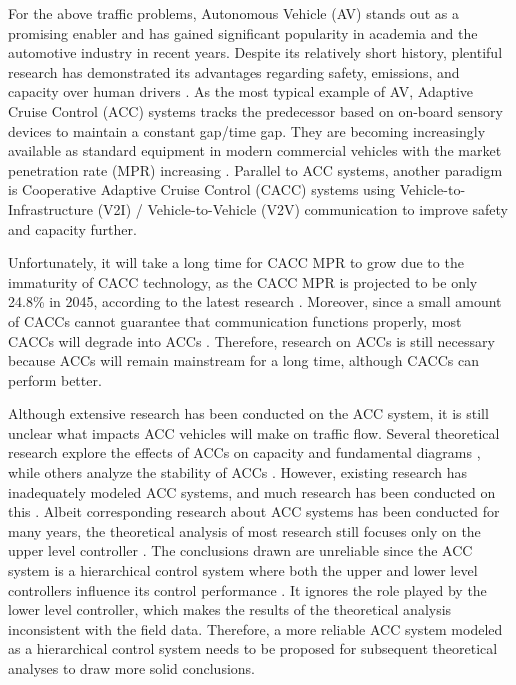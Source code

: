 \documentclass[journal]{IEEEtran}
\begin{document}
For the above traffic problems, Autonomous Vehicle (AV) stands out as a promising enabler and has gained significant popularity in academia and the automotive industry in recent years. Despite its relatively short history, plentiful research has demonstrated its advantages regarding safety, emissions, and capacity over human drivers \citep{Wang2019,Sarker2019,Dey2015}. As the most typical example of AV, Adaptive Cruise Control (ACC) systems tracks the predecessor based on on-board sensory devices to maintain a constant gap/time gap. They are becoming increasingly available as standard equipment in modern commercial vehicles with the market penetration rate (MPR) increasing \citep{Wilson2011}. Parallel to ACC systems, another paradigm is Cooperative Adaptive Cruise Control (CACC) systems using Vehicle-to-Infrastructure (V2I) / Vehicle-to-Vehicle (V2V) communication to improve safety and capacity further.

Unfortunately, it will take a long time for CACC MPR to grow due to the immaturity of CACC technology, as the CACC MPR is projected to be only 24.8\% in 2045, according to the latest research \citep{Bansal2017}. Moreover, since a small amount of CACCs cannot guarantee that communication functions properly, most CACCs will degrade into ACCs \citep{Wang2018,Ruan2021,Zhou2021}. Therefore, research on ACCs is still necessary because ACCs will remain mainstream for a long time, although CACCs can perform better.

Although extensive research has been conducted on the ACC system, it is still unclear what impacts ACC vehicles will make on traffic flow. Several theoretical research explore the effects of ACCs on capacity and fundamental diagrams \citep{Shang2021,Li2022,Ciuffo2021}, while others analyze the stability of ACCs \citep{Flores2018,Lee2021,Zhou2017}. However, existing research has inadequately modeled ACC systems, and much research has been conducted on this \citep{Gunter2019,Shang2022,Milanes2014}. Albeit corresponding research about ACC systems has been conducted for many years, the theoretical analysis of most research still focuses only on the upper level controller \citep{jiaEnhancedCooperativeCarfollowing2016,Zhou2021,ruanImpactsInformationFlow2022}. The conclusions drawn are unreliable since the ACC system is a hierarchical control system where both the upper and lower level controllers influence its control performance \citep{Rajamani2011}. It ignores the role played by the lower level controller, which makes the results of the theoretical analysis inconsistent with the field data. Therefore, a more reliable ACC system modeled as a hierarchical control system needs to be proposed for subsequent theoretical analyses to draw more solid conclusions.
\end{document}

